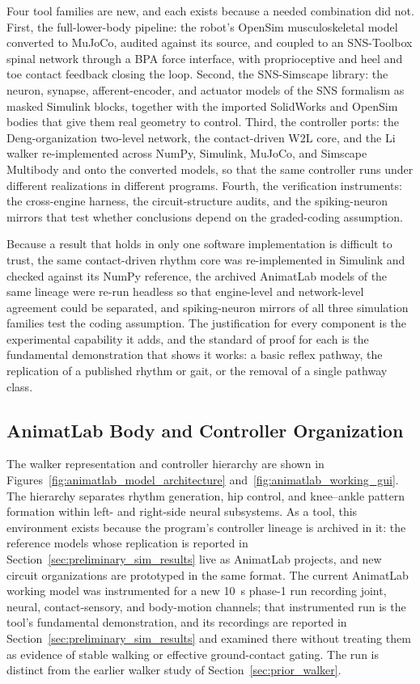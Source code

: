 Four tool families are new, and each exists because a needed combination did not. First, the full-lower-body pipeline: the robot's OpenSim musculoskeletal model converted to MuJoCo, audited against its source, and coupled to an SNS-Toolbox spinal network through a BPA force interface, with proprioceptive and heel and toe contact feedback closing the loop. Second, the SNS-Simscape library: the neuron, synapse, afferent-encoder, and actuator models of the SNS formalism as masked Simulink blocks, together with the imported SolidWorks and OpenSim bodies that give them real geometry to control. Third, the controller ports: the Deng-organization two-level network, the contact-driven W2L core, and the Li walker re-implemented across NumPy, Simulink, MuJoCo, and Simscape Multibody and onto the converted models, so that the same controller runs under different realizations in different programs. Fourth, the verification instruments: the cross-engine harness, the circuit-structure audits, and the spiking-neuron mirrors that test whether conclusions depend on the graded-coding assumption.

Because a result that holds in only one software implementation is difficult to trust, the same contact-driven rhythm core was re-implemented in Simulink and checked against its NumPy reference, the archived AnimatLab models of the same lineage were re-run headless so that engine-level and network-level agreement could be separated, and spiking-neuron mirrors of all three simulation families test the coding assumption. The justification for every component is the experimental capability it adds, and the standard of proof for each is the fundamental demonstration that shows it works: a basic reflex pathway, the replication of a published rhythm or gait, or the removal of a single pathway class.

\subsection{AnimatLab Body and Controller Organization}

The walker representation and controller hierarchy are shown in Figures~\ref{fig:animatlab_model_architecture} and~\ref{fig:animatlab_working_gui}. The hierarchy separates rhythm generation, hip control, and knee--ankle pattern formation within left- and right-side neural subsystems. As a tool, this environment exists because the program's controller lineage is archived in it: the reference models whose replication is reported in Section~\ref{sec:preliminary_sim_results} live as AnimatLab projects, and new circuit organizations are prototyped in the same format. The current AnimatLab working model was instrumented for a new \qty{10}{\second} phase-1 run recording joint, neural, contact-sensory, and body-motion channels; that instrumented run is the tool's fundamental demonstration, and its recordings are reported in Section~\ref{sec:preliminary_sim_results} and examined there without treating them as evidence of stable walking or effective ground-contact gating. The run is distinct from the earlier walker study of Section~\ref{sec:prior_walker}.

